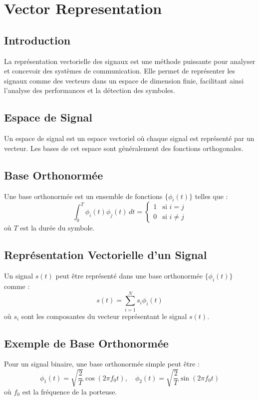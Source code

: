 \documentclass[10pt,a4paper]{article}
\begin{document}
\section*{Vector Representation}

\subsection*{Introduction}
La représentation vectorielle des signaux est une méthode puissante pour analyser et concevoir des systèmes de communication. Elle permet de représenter les signaux comme des vecteurs dans un espace de dimension finie, facilitant ainsi l'analyse des performances et la détection des symboles.

\subsection*{Espace de Signal}
Un espace de signal est un espace vectoriel où chaque signal est représenté par un vecteur. Les bases de cet espace sont généralement des fonctions orthogonales.

\subsection*{Base Orthonormée}
Une base orthonormée est un ensemble de fonctions \(\{\phi_i(t)\}\) telles que :
\[
\int_{0}^{T} \phi_i(t) \phi_j(t) \, dt = \begin{cases}
1 & \text{si } i = j \\
0 & \text{si } i \neq j
\end{cases}
\]
où \(T\) est la durée du symbole.

\subsection*{Représentation Vectorielle d'un Signal}
Un signal \(s(t)\) peut être représenté dans une base orthonormée \(\{\phi_i(t)\}\) comme :
\[
s(t) = \sum_{i=1}^{N} s_i \phi_i(t)
\]
où \(s_i\) sont les composantes du vecteur représentant le signal \(s(t)\).

\subsection*{Exemple de Base Orthonormée}
Pour un signal binaire, une base orthonormée simple peut être :
\[
\phi_1(t) = \sqrt{\frac{2}{T}} \cos(2\pi f_0 t), \quad \phi_2(t) = \sqrt{\frac{2}{T}} \sin(2\pi f_0 t)
\]
où \(f_0\) est la fréquence de la porteuse.
\end{document}
